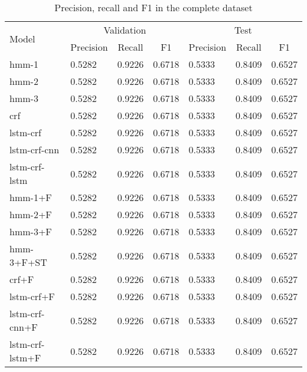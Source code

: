 \documentclass[sigconf]{acmart}
\begin{document}
\begin{table}[h]
  \small
  \begin{center}
    \begin{tabular}{ |l|l|l|l|l|l|l| }
      \hline
      \multirow{2}{*}{Model} & \multicolumn{3}{c|}{Validation} & \multicolumn{3}{c|}{Test} \\
                             & \multicolumn{1}{c}{Precision} & \multicolumn{1}{c}{Recall} & \multicolumn{1}{c|}{F1}
                             & \multicolumn{1}{c}{Precision} & \multicolumn{1}{c}{Recall} & \multicolumn{1}{c|}{F1} \\
      \hline
      hmm-1           & 0.5282 & 0.9226 & 0.6718 & 0.5333 & 0.8409 & 0.6527 \\
      hmm-2           & 0.5282 & 0.9226 & 0.6718 & 0.5333 & 0.8409 & 0.6527 \\
      hmm-3           & 0.5282 & 0.9226 & 0.6718 & 0.5333 & 0.8409 & 0.6527 \\
      crf             & 0.5282 & 0.9226 & 0.6718 & 0.5333 & 0.8409 & 0.6527 \\
      lstm-crf        & 0.5282 & 0.9226 & 0.6718 & 0.5333 & 0.8409 & 0.6527 \\
      lstm-crf-cnn    & 0.5282 & 0.9226 & 0.6718 & 0.5333 & 0.8409 & 0.6527 \\
      lstm-crf-lstm   & 0.5282 & 0.9226 & 0.6718 & 0.5333 & 0.8409 & 0.6527 \\
      hmm-1+F         & 0.5282 & 0.9226 & 0.6718 & 0.5333 & 0.8409 & 0.6527 \\
      hmm-2+F         & 0.5282 & 0.9226 & 0.6718 & 0.5333 & 0.8409 & 0.6527 \\
      hmm-3+F         & 0.5282 & 0.9226 & 0.6718 & 0.5333 & 0.8409 & 0.6527 \\
      hmm-3+F+ST      & 0.5282 & 0.9226 & 0.6718 & 0.5333 & 0.8409 & 0.6527 \\
      crf+F           & 0.5282 & 0.9226 & 0.6718 & 0.5333 & 0.8409 & 0.6527 \\
      lstm-crf+F      & 0.5282 & 0.9226 & 0.6718 & 0.5333 & 0.8409 & 0.6527 \\
      lstm-crf-cnn+F  & 0.5282 & 0.9226 & 0.6718 & 0.5333 & 0.8409 & 0.6527 \\
      lstm-crf-lstm+F & 0.5282 & 0.9226 & 0.6718 & 0.5333 & 0.8409 & 0.6527 \\
      \hline
    \end{tabular}
  \end{center}
  \caption{Precision, recall and F1 in the complete dataset}
  \label{tab:experiment1}
\end{table}
\end{document}

